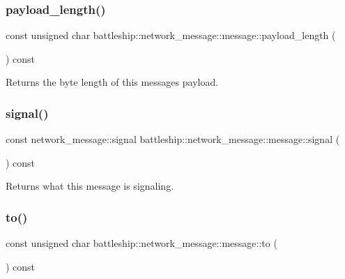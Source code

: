 \subsubsection{\texorpdfstring{payload\+\_\+length()}{payload\_length()}}
{\footnotesize\ttfamily const unsigned char battleship\+::network\+\_\+message\+::message\+::payload\+\_\+length (\begin{DoxyParamCaption}{ }\end{DoxyParamCaption}) const\hspace{0.3cm}{\ttfamily [inline]}}

\begin{DoxyReturn}{Returns}
the byte length of this message\textquotesingle{}s payload. 
\end{DoxyReturn}
\mbox{\label{classbattleship_1_1network__message_1_1message_a5709b3059dfb73e135dca1c6f248f797}} 
\subsubsection{\texorpdfstring{signal()}{signal()}}
{\footnotesize\ttfamily const network\+\_\+message\+::signal battleship\+::network\+\_\+message\+::message\+::signal (\begin{DoxyParamCaption}{ }\end{DoxyParamCaption}) const\hspace{0.3cm}{\ttfamily [inline]}}

\begin{DoxyReturn}{Returns}
what this message is signaling. 
\end{DoxyReturn}
\mbox{\label{classbattleship_1_1network__message_1_1message_a36145cf7dfc9102da280adfad5d1a972}} 
\subsubsection{\texorpdfstring{to()}{to()}}
{\footnotesize\ttfamily const unsigned char battleship\+::network\+\_\+message\+::message\+::to (\begin{DoxyParamCaption}{ }\end{DoxyParamCaption}) const\hspace{0.3cm}{\ttfamily [inline]}}

